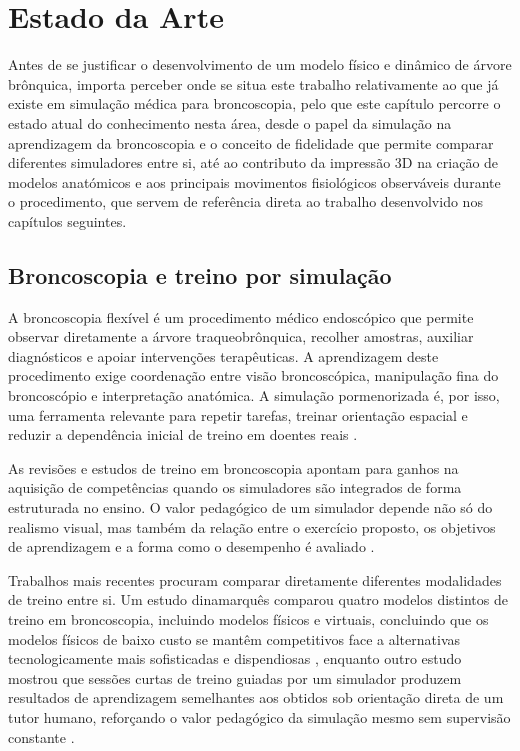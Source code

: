\chapter{Estado da Arte}

Antes de se justificar o desenvolvimento de um modelo físico e dinâmico de árvore brônquica, importa perceber onde se situa este trabalho relativamente ao que já existe em simulação médica para broncoscopia, pelo que este capítulo percorre o estado atual do conhecimento nesta área, desde o papel da simulação na aprendizagem da broncoscopia e o conceito de fidelidade que permite comparar diferentes simuladores entre si, até ao contributo da impressão 3D na criação de modelos anatómicos e aos principais movimentos fisiológicos observáveis durante o procedimento, que servem de referência direta ao trabalho desenvolvido nos capítulos seguintes.

\section{Broncoscopia e treino por simulação}
A broncoscopia flexível é um procedimento médico endoscópico que permite observar diretamente a árvore traqueobrônquica, recolher amostras, auxiliar diagnósticos e apoiar intervenções terapêuticas. A aprendizagem deste procedimento exige coordenação entre visão broncoscópica, manipulação fina do broncoscópio e interpretação anatómica. A simulação pormenorizada é, por isso, uma ferramenta relevante para repetir tarefas, treinar orientação espacial e reduzir a dependência inicial de treino em doentes reais \parencite{Davoudi2008,Kennedy2013,Fielding2014,Nilsson2017}.

As revisões e estudos de treino em broncoscopia apontam para ganhos na aquisição de competências quando os simuladores são integrados de forma estruturada no ensino. O valor pedagógico de um simulador depende não só do realismo visual, mas também da relação entre o exercício proposto, os objetivos de aprendizagem e a forma como o desempenho é avaliado \parencite{Kennedy2013,Fielding2014,Gopal2018}.

Trabalhos mais recentes procuram comparar diretamente diferentes modalidades de treino entre si. Um estudo dinamarquês comparou quatro modelos distintos de treino em broncoscopia, incluindo modelos físicos e virtuais, concluindo que os modelos físicos de baixo custo se mantêm competitivos face a alternativas tecnologicamente mais sofisticadas e dispendiosas \parencite{Kronborg2024}, enquanto outro estudo mostrou que sessões curtas de treino guiadas por um simulador produzem resultados de aprendizagem semelhantes aos obtidos sob orientação direta de um tutor humano, reforçando o valor pedagógico da simulação mesmo sem supervisão constante \parencite{Schertel2021}.

